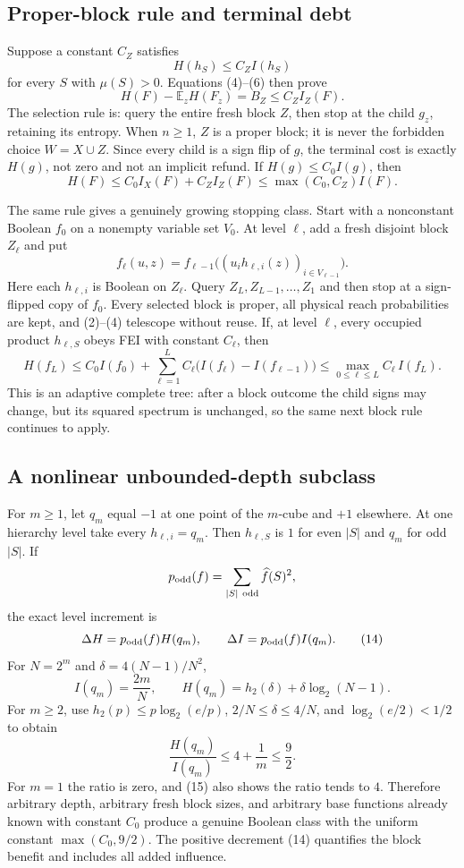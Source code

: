 \subsection*{Proper-block rule and terminal debt}

Suppose a constant $C_Z$ satisfies
\[
 H(h_S)\le C_Z I(h_S)                                          \tag{9}
\]
for every $S$ with $\mu(S)>0$.  Equations (4)--(6) then prove
\[
 H(F)-\mathbb E_zH(F_z)=B_Z\le C_ZI_Z(F).                     \tag{10}
\]
The selection rule is: query the entire fresh block $Z$, then stop at the
child $g_z$, retaining its entropy.  When $n\ge1$, $Z$ is a proper block;
it is never the forbidden choice $W=X\cup Z$.  Since every child is a sign
flip of $g$, the terminal cost is exactly $H(g)$, not zero and not an
implicit refund.  If $H(g)\le C_0I(g)$, then
\[
 H(F)\le C_0I_X(F)+C_ZI_Z(F)
 \le \max(C_0,C_Z)I(F).                                       \tag{11}
\]

The same rule gives a genuinely growing stopping class.  Start with a
nonconstant Boolean $f_0$ on a nonempty variable set $V_0$.  At level
$\ell$, add a fresh disjoint block $Z_\ell$ and put
\[
 f_\ell(u,z)=f_{\ell-1}
 \bigl((u_i h_{\ell,i}(z))_{i\in V_{\ell-1}}\bigr).            \tag{12}
\]
Here each $h_{\ell,i}$ is Boolean on $Z_\ell$.  Query
$Z_L,Z_{L-1},\ldots,Z_1$ and then stop at a sign-flipped copy of $f_0$.
Every selected block is proper, all physical reach probabilities are kept,
and (2)--(4) telescope without reuse.  If, at level $\ell$, every occupied
product $h_{\ell,S}$ obeys FEI with constant $C_\ell$, then
\[
 H(f_L)\le C_0I(f_0)+
 \sum_{\ell=1}^LC_\ell\bigl(I(f_\ell)-I(f_{\ell-1})\bigr)
 \le \max_{0\le\ell\le L}C_\ell\,I(f_L).                     \tag{13}
\]
This is an adaptive complete tree: after a block outcome the child signs may
change, but its squared spectrum is unchanged, so the same next block rule
continues to apply.

\subsection*{A nonlinear unbounded-depth subclass}

For $m\ge1$, let $q_m$ equal $-1$ at one point of the $m$-cube and $+1$
elsewhere.  At one hierarchy level take every $h_{\ell,i}=q_m$.  Then
$h_{\ell,S}$ is $1$ for even $|S|$ and $q_m$ for odd $|S|$.  If
\[
 p_{\rm odd}(f)=\sum_{|S|\ {\rm odd}}\widehat f(S)^2,
\]
the exact level increment is
\[
 \Delta H=p_{\rm odd}(f)H(q_m),\qquad
 \Delta I=p_{\rm odd}(f)I(q_m).                               \tag{14}
\]
For $N=2^m$ and $\delta=4(N-1)/N^2$,
\[
 I(q_m)=\frac{2m}{N},\qquad
 H(q_m)=h_2(\delta)+\delta\log_2(N-1).                         \tag{15}
\]
For $m\ge2$, use $h_2(p)\le p\log_2(e/p)$,
$2/N\le\delta\le4/N$, and $\log_2(e/2)<1/2$ to obtain
\[
 \frac{H(q_m)}{I(q_m)}
 \le 4+\frac1m\le\frac92.                                    \tag{16}
\]
For $m=1$ the ratio is zero, and (15) also shows the ratio tends to $4$.
Therefore arbitrary depth, arbitrary fresh block sizes, and arbitrary base
functions already known with constant $C_0$ produce a genuine Boolean class
with the uniform constant $\max(C_0,9/2)$.  The positive decrement (14)
quantifies the block benefit and includes all added influence.

